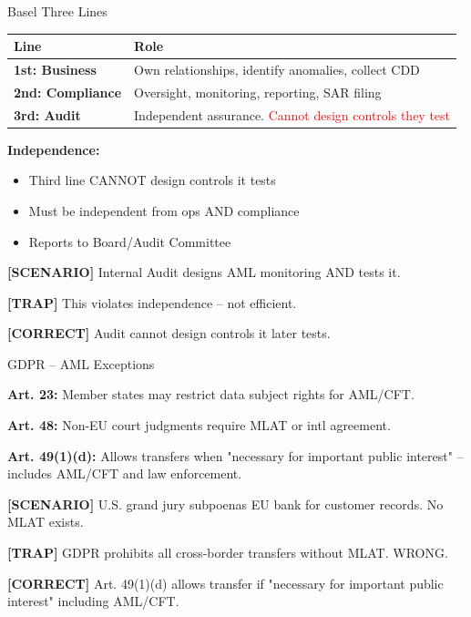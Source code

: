 \documentclass[8pt,aspectratio=169,fontsize=7pt]{beamer}
\renewcommand{\tiny}{\fontsize{4pt}{5pt}\selectfont}
\renewcommand{\normalsize}{\fontsize{8pt}{9pt}\selectfont}
\newcommand{\trap}[1]{%
	\begin{block}{\textcolor{redtrap}{\textbf{[TRAP]}}}
		\textcolor{redtrap}{\tiny #1}
	\end{block}
}
\newcommand{\scenario}[1]{%
	\begin{block}{\textbf{[SCENARIO]}}
		\tiny #1
	\end{block}
}
\newcommand{\correct}[1]{%
	\begin{block}{\textcolor{greencorrect}{\textbf{[CORRECT]}}}
		\textcolor{greencorrect}{\tiny #1}
	\end{block}
}
\begin{document}
	\begin{frame}{\normalsize Basel Three Lines}
		
		\begin{table}
			\begin{tabular}{|p{2.2cm}|p{6cm}|}
				\hline
				\textbf{Line} & \textbf{Role} \\
				\hline
				\textbf{1st: Business} & Own relationships, identify anomalies, collect CDD \\
				\hline
				\textbf{2nd: Compliance} & Oversight, monitoring, reporting, SAR filing \\
				\hline
				\textbf{3rd: Audit} & Independent assurance. \textcolor{red}{Cannot design controls they test} \\
				\hline
			\end{tabular}
		\end{table}
		
		\textbf{Independence:}
		\begin{itemize}
			\item Third line CANNOT design controls it tests
			\item Must be independent from ops AND compliance
			\item Reports to Board/Audit Committee
		\end{itemize}
		
		\scenario{Internal Audit designs AML monitoring AND tests it.}
		
		\trap{This violates independence -- not efficient.}
		
		\correct{Audit cannot design controls it later tests.}
	\end{frame}
	
	\begin{frame}{\normalsize GDPR -- AML Exceptions}
		
		\textbf{Art. 23:} Member states may restrict data subject rights for AML/CFT.
		
		\textbf{Art. 48:} Non-EU court judgments require MLAT or intl agreement.
		
		\textbf{Art. 49(1)(d):} Allows transfers when "necessary for important public interest" -- includes AML/CFT and law enforcement.
		
		\scenario{U.S. grand jury subpoenas EU bank for customer records. No MLAT exists.}
		
		\trap{GDPR prohibits all cross-border transfers without MLAT. WRONG.}
		
		\correct{Art. 49(1)(d) allows transfer if "necessary for important public interest" including AML/CFT.}
	\end{frame}
	
\end{document}
